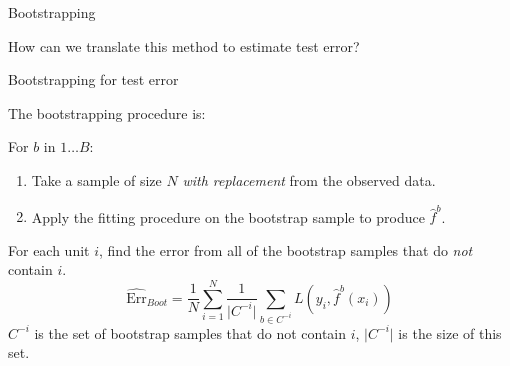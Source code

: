 \documentclass[xcolor={table}, handout]{beamer}
\begin{document}



\begin{frame}{Bootstrapping}

\begin{wideitemize}
\item How can we translate this method to estimate test error?
\end{wideitemize}

\end{frame}



\begin{frame}{Bootstrapping for test error}


The bootstrapping procedure is:

\begin{wideitemize}
\item For $b$ in $1\dots B$:\pause
\begin{enumerate}

    \item Take a sample of size $N$  \textit{with replacement} from the observed data.\pause

    \item Apply the fitting procedure on the bootstrap sample to produce $\hat f^b$.
    \end{enumerate}
\pause
\item For each unit $i$, find the error from all of the bootstrap samples that do \textit{not} contain $i$.\pause
\[
\widehat{\textrm{Err}}_{Boot} = \frac{1}{N}\sum_{i = 1}^N \frac{1}{\lvert C^{-i} \rvert}\sum_{b \in C^{-i}} L(y_i, \hat f^b (x_i))
\]
$C^{-i}$ is the set of bootstrap samples that do not contain $i$, $\lvert C^{-i} \rvert$ is the size of this set.
\end{wideitemize}

\end{frame}
\end{document}
